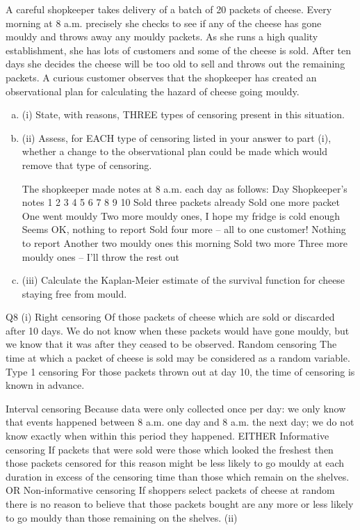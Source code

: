 \documentclass[a4paper,12pt]{article}
\begin{document}
A careful shopkeeper takes delivery of a batch of 20 packets of cheese. Every
morning at 8 a.m. precisely she checks to see if any of the cheese has gone mouldy
and throws away any mouldy packets.
As she runs a high quality establishment, she has lots of customers and some of the
cheese is sold. After ten days she decides the cheese will be too old to sell and throws
out the remaining packets.
A curious customer observes that the shopkeeper has created an observational plan for
calculating the hazard of cheese going mouldy.
\begin{enumerate}[(a)]
\item (i) State, with reasons, THREE types of censoring present in this situation.

\item (ii) Assess, for EACH type of censoring listed in your answer to part (i), whether a
change to the observational plan could be made which would remove that type
of censoring.

The shopkeeper made notes at 8 a.m. each day as follows:
Day Shopkeeper’s notes
1
2
3
4
5
6
7
8
9
10 Sold three packets already
Sold one more packet
One went mouldy
Two more mouldy ones, I hope my fridge is cold enough
Seems OK, nothing to report
Sold four more – all to one customer!
Nothing to report
Another two mouldy ones this morning
Sold two more
Three more mouldy ones – I’ll throw the rest out
\item (iii) Calculate the Kaplan-Meier estimate of the survival function for cheese
staying free from mould.
\end{enumerate}
\newpage
Q8
(i)
Right censoring 
Of those packets of cheese which are sold or discarded after 10 days.
We do not know when these packets would have gone mouldy, but we know that it was after they ceased to be observed. 
Random censoring 
The time at which a packet of cheese is sold may be considered as
a random variable. 
Type 1 censoring 
For those packets thrown out at day 10, the time of censoring is known in advance.

Interval censoring 
Because data were only collected once per day: we only know that events happened between 8 a.m. one day and 8 a.m. the next day;
we do not know exactly when within this period they happened. 
EITHER
Informative censoring 
If packets that were sold were those which looked the freshest then those packets censored for this reason might be less likely to go mouldy at each duration in excess of the censoring time than those which remain on the shelves. 
OR
Non-informative censoring
If shoppers select packets of cheese at random there is no reason to believe that those packets bought are any more or less likely to go mouldy than those remaining on the shelves.
(ii)
\end{document}
